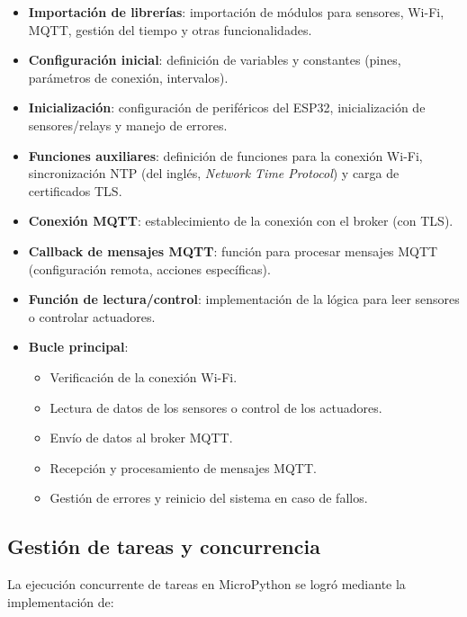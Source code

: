 \begin{itemize}
    \item \textbf{Importación de librerías}: importación de módulos para sensores,
          Wi-Fi, MQTT, gestión del tiempo y otras funcionalidades.
    \item \textbf{Configuración inicial}: definición de variables y constantes
          (pines, parámetros de conexión, intervalos).
    \item \textbf{Inicialización}: configuración de periféricos del ESP32,
          inicialización de sensores/relays y manejo de errores.
    \item \textbf{Funciones auxiliares}: definición de funciones para la conexión Wi-Fi,
          sincronización NTP (del inglés, \textit{Network Time Protocol}) y carga de
          certificados TLS.
    \item \textbf{Conexión MQTT}: establecimiento de la conexión con el broker (con TLS).
    \item \textbf{Callback de mensajes MQTT}: función para procesar mensajes MQTT
          (configuración remota, acciones específicas).
    \item \textbf{Función de lectura/control}: implementación de la lógica para leer
          sensores o controlar actuadores.
    \item \textbf{Bucle principal}:
          \begin{itemize}
              \item Verificación de la conexión Wi-Fi.
              \item Lectura de datos de los sensores o control de los actuadores.
              \item Envío de datos al broker MQTT.
              \item Recepción y procesamiento de mensajes MQTT.
              \item Gestión de errores y reinicio del sistema en caso de fallos.
          \end{itemize}
\end{itemize}

\subsection{Gestión de tareas y concurrencia}

La ejecución concurrente de tareas en MicroPython se logró mediante la
implementación de:

